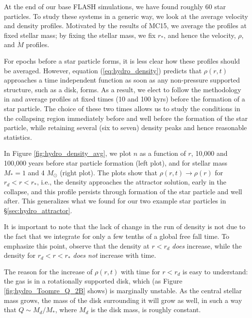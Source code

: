 \documentclass[../dissertation.tex]{subfiles}
\begin{document}
At the end of our base FLASH simulations, we have found roughly 60 star particles.  
To study these systems in a generic way, we look at the 
average velocity and density profiles. Motivated by the results of MC15, 
we average the profiles at fixed stellar mass;  
by fixing the stellar mass, 
we fix $r_*$, and hence the velocity, $\rho$, and $\dot{M}$ profiles.  

For epochs before a star particle forms, it is less clear how these profiles 
should be averaged.  However, equation (\ref{eq:hydro_density}) predicts that 
$\rho(r,t)$ approaches a time independent function as soon as any 
non-pressure supported structure, such as a disk, forms.
As a result, we elect to follow the methodology in
\citet{2015ApJ...800...49L} and average profiles at fixed times 
(10 and 100 kyrs) before the formation of a star particle.  The 
choice of these two times allows us to study the conditions in the 
collapsing region immediately before and well before the formation of 
the star particle, while retaining several (six to seven) density peaks and hence
reasonable statistics.  

In Figure \ref{fig:hydro_density_avg}, we plot $n$ as a function of 
$r$, 10,000 and 100,000 years before star particle formation (left plot),
and for stellar mass $M_* = 1$ 
and 4 $M_{\odot}$ (right plot). The plots show 
that  $\rho(r,t) \to \rho(r)$ for $r_d< r<r_*$, i.e., the density approaches the attractor solution,
early in the collapse, and this profile persists through formation 
of the star particle and well after. This generalizes what we found for 
our two example star particles in \S \ref{sec:hydro_attractor}.  

It is important to note that the lack of change in the run of density is not due to the fact that we integrate for only a few tenths of a global free fall time. To emphasize this point, observe that the density at $r<r_d$ {\em does} increase, while the density for $r_d< r<r_*$ 
{\em does not} increase with time.

The reason for the increase of $\rho(r,t)$ with time for $r<r_d$ is easy to understand: the gas is in a rotationally supported disk, which (as Figure \ref{fig:hydro_Toomre_Q_2B} shows) is marginally unstable. As the central stellar mass grows, the mass of the disk surrounding it will grow as well, in such a way that $Q\sim M_d/M_*$, where $M_d$ is the disk mass, is roughly constant. 
\end{document}
